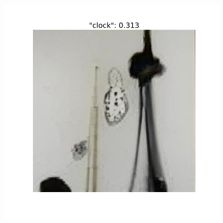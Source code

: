 \documentclass[12pt,a4paper,openany]{book}
\begin{document}
\begin{figure}[!htb]
\endminipage\hfill
{}
  \includegraphics[width=\linewidth]{figs/clock_cossim.png}
\endminipage
\end{figure}
\end{document}
